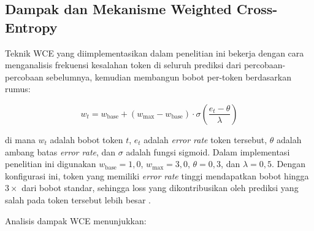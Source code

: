 \subsection{Dampak dan Mekanisme Weighted Cross-Entropy}

Teknik WCE yang diimplementasikan dalam penelitian ini bekerja dengan cara menganalisis frekuensi kesalahan token di seluruh prediksi dari percobaan-percobaan sebelumnya, kemudian membangun bobot per-token berdasarkan rumus:

\begin{equation}
\label{eq:wce_weight}
    w_t = w_{\text{base}} + (w_{\text{max}} - w_{\text{base}}) \cdot \sigma\!\left(\frac{e_t - \theta}{\lambda}\right)
\end{equation}
\vspace{1cm}

\noindent di mana $w_t$ adalah bobot token $t$, $e_t$ adalah \textit{error rate} token tersebut, $\theta$ adalah ambang batas \textit{error rate}, dan $\sigma$ adalah fungsi sigmoid. Dalam implementasi penelitian ini digunakan $w_{\text{base}} = 1{,}0$, $w_{\text{max}} = 3{,}0$, $\theta = 0{,}3$, dan $\lambda = 0{,}5$. Dengan konfigurasi ini, token yang memiliki \textit{error rate} tinggi mendapatkan bobot hingga $3\times$ dari bobot standar, sehingga loss yang dikontribusikan oleh prediksi yang salah pada token tersebut lebih besar \cite{pineiromartin2024weighted}.

Analisis dampak WCE menunjukkan:

